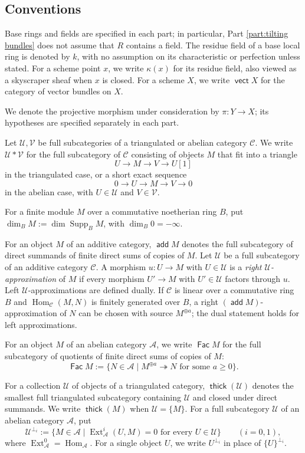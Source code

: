 \documentclass[a4paper,reqno]{amsart}
\def\A{\mathcal{A}}
\def\C{\mathcal{C}}
\def\U{\mathcal{U}}
\def\V{\mathcal{V}}
\DeclareMathOperator{\add}{\mathsf{add}}
\DeclareMathOperator{\Fac}{\mathsf{Fac}}
\DeclareMathOperator{\vect}{\mathsf{vect}}
\DeclareMathOperator{\thick}{\mathsf{thick}}
\DeclareMathOperator{\Hom}{Hom}
\DeclareMathOperator{\Ext}{Ext}
\theoremstyle{definition}
\begin{document}
\subsection*{Conventions}
Base rings and fields are specified in each part; in particular, Part \ref{part:tilting bundles} does not assume that $R$ contains a field. The residue field of a base local ring is denoted by $k$, with no assumption on its characteristic or perfection unless stated. For a scheme point $x$, we write $\kappa(x)$ for its residue field, also viewed as a skyscraper sheaf when $x$ is closed. For a scheme $X$, we write $\vect X$ for the category of vector bundles on $X$.

We denote the projective morphism under consideration by $\pi\colon Y\to X$; its hypotheses are specified separately in each part.

Let $\U,\V$ be full subcategories of a triangulated or abelian category $\C$. We write $\U*\V$ for the full subcategory of $\C$ consisting of objects $M$ that fit into a triangle
\[
U\longrightarrow M\longrightarrow V\longrightarrow U[1]
\]
in the triangulated case, or a short exact sequence
\[
0\longrightarrow U\longrightarrow M\longrightarrow V\longrightarrow0
\]
in the abelian case, with $U\in\U$ and $V\in\V$.

For a finite module $M$ over a commutative noetherian ring $B$, put $\dim_BM:=\dim\operatorname{Supp}_B M$, with $\dim_B0=-\infty$.

For an object $M$ of an additive category, $\add M$ denotes the full subcategory of direct summands of finite direct sums of copies of $M$. Let $\U$ be a full subcategory of an additive category $\C$. A morphism $u\colon U\to M$ with $U\in\U$ is a \emph{right $\U$-approximation} of $M$ if every morphism $U'\to M$ with $U'\in\U$ factors through $u$. Left $\U$-approximations are defined dually. If $\C$ is linear over a commutative ring $B$ and $\Hom_{\C}(M,N)$ is finitely generated over $B$, a right $(\add M)$-approximation of $N$ can be chosen with source $M^{\oplus a}$; the dual statement holds for left approximations.

For an object $M$ of an abelian category $\A$, we write $\Fac M$ for the full subcategory of quotients of finite direct sums of copies of $M$:
\[
\Fac M:=\{N\in\A\mid M^{\oplus a}\twoheadrightarrow N\text{ for some }a\ge0\}.
\]

For a collection $\U$ of objects of a triangulated category, $\thick(\U)$ denotes the smallest full triangulated subcategory containing $\U$ and closed under direct summands. We write $\thick(M)$ when $\U=\{M\}$. For a full subcategory $\U$ of an abelian category $\A$, put
\[
\U^{\perp_i}:=\{M\in\A\mid\Ext_{\A}^i(U,M)=0\text{ for every }U\in\U\}
\qquad(i=0,1),
\]
where $\Ext_{\A}^0=\Hom_{\A}$. For a single object $U$, we write $U^{\perp_i}$ in place of $\{U\}^{\perp_i}$.
\end{document}
